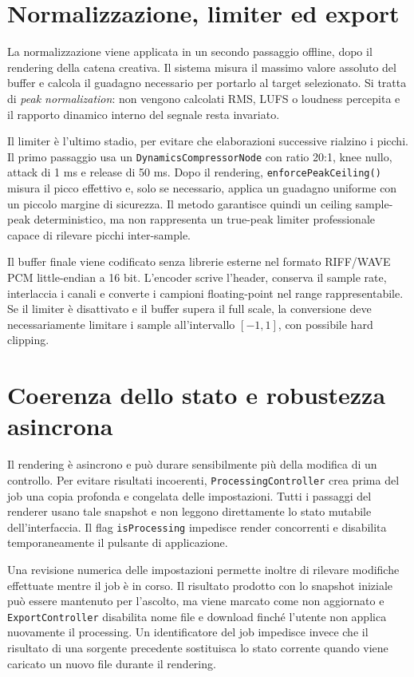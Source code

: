 \documentclass[11pt,a4paper]{article}
\begin{document}
	\section{Normalizzazione, limiter ed export}
	
	La normalizzazione viene applicata in un secondo passaggio offline, dopo il rendering della catena creativa. Il sistema misura il massimo valore assoluto del buffer e calcola il guadagno necessario per portarlo al target selezionato. Si tratta di \emph{peak normalization}: non vengono calcolati RMS, LUFS o loudness percepita e il rapporto dinamico interno del segnale resta invariato.
	
	Il limiter è l'ultimo stadio, per evitare che elaborazioni successive rialzino i picchi. Il primo passaggio usa un \texttt{DynamicsCompressorNode} con ratio 20:1, knee nullo, attack di 1 ms e release di 50 ms. Dopo il rendering, \texttt{enforcePeakCeiling()} misura il picco effettivo e, solo se necessario, applica un guadagno uniforme con un piccolo margine di sicurezza. Il metodo garantisce quindi un ceiling sample-peak deterministico, ma non rappresenta un true-peak limiter professionale capace di rilevare picchi inter-sample.
	
	Il buffer finale viene codificato senza librerie esterne nel formato RIFF/WAVE PCM little-endian a 16 bit. L'encoder scrive l'header, conserva il sample rate, interlaccia i canali e converte i campioni floating-point nel range rappresentabile. Se il limiter è disattivato e il buffer supera il full scale, la conversione deve necessariamente limitare i sample all'intervallo $[-1,1]$, con possibile hard clipping.
	
	\section{Coerenza dello stato e robustezza asincrona}
	
	Il rendering è asincrono e può durare sensibilmente più della modifica di un controllo. Per evitare risultati incoerenti, \texttt{ProcessingController} crea prima del job una copia profonda e congelata delle impostazioni. Tutti i passaggi del renderer usano tale snapshot e non leggono direttamente lo stato mutabile dell'interfaccia. Il flag \texttt{isProcessing} impedisce render concorrenti e disabilita temporaneamente il pulsante di applicazione.
	
	Una revisione numerica delle impostazioni permette inoltre di rilevare modifiche effettuate mentre il job è in corso. Il risultato prodotto con lo snapshot iniziale può essere mantenuto per l'ascolto, ma viene marcato come non aggiornato e \texttt{ExportController} disabilita nome file e download finché l'utente non applica nuovamente il processing. Un identificatore del job impedisce invece che il risultato di una sorgente precedente sostituisca lo stato corrente quando viene caricato un nuovo file durante il rendering.
	
\end{document}
